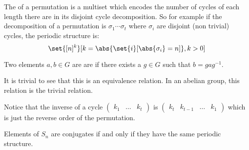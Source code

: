 \documentclass[10pt]{article}
\def\pmat#1{\begin{pmatrix} #1 \end{pmatrix}}
\begin{document}
\begin{defn*}

    The  of a permutation is a multiset which encodes the number of cycles of each length there are in its disjoint cycle decomposition.
    So for example if the decomposition of a permutation is $\sigma_1\cdots\sigma_t$ where $\sigma_i$ are disjoint (non trivial) cycles, the periodic structure is:
    \[ \set{[n]^k}[k=\abs{\set{i}[\abs{\sigma_i}=n]}, k>0] \]

\end{defn*}

\begin{defn*}

    Two elements $a,b\in G$ are  are if there exists a $g\in G$ such that $b=gag^{-1}$.

\end{defn*}

It is trivial to see that this is an equivalence relation.
In an abelian group, this relation is the trivial relation.

Notice that the inverse of a cycle $\pmat{k_1&\ldots&k_t}$ is $\pmat{k_t&k_{t-1}&\ldots&k_1}$ which is just the reverse order of the permutation.

\begin{thrm*}

    Elements of $S_n$ are conjugates if and only if they have the same periodic structure.

\end{thrm*}
\end{document}
